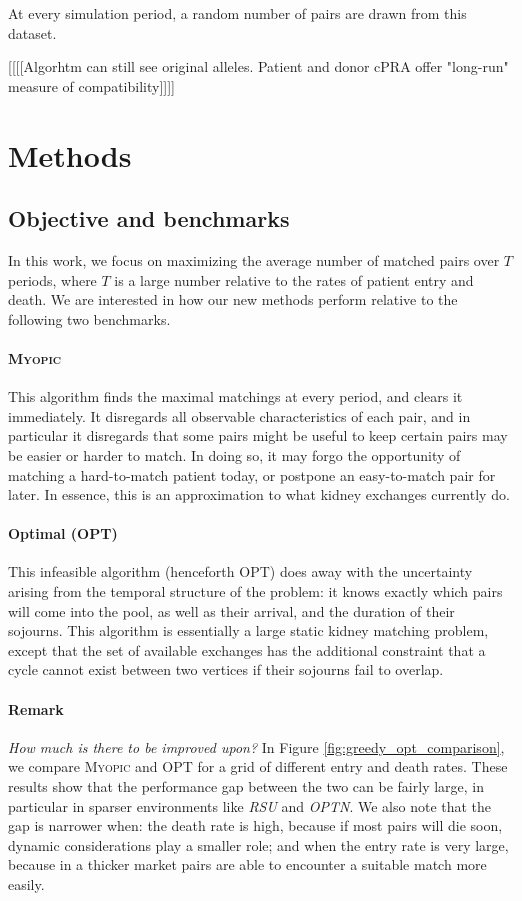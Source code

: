 \documentclass[format=acmsmall, review=false]{acmart}
\begin{document}
At every simulation period, a random number of pairs are drawn from this dataset.

[[[[Algorhtm can still see original alleles. Patient and donor cPRA offer "long-run" measure of compatibility]]]]


\section{Methods}

\subsection{Objective and benchmarks}

In this work, we focus on maximizing the average number of matched pairs over $T$ periods, where $T$ is a large number relative to the rates of patient entry and death. We are interested in how our new methods perform relative to the following two benchmarks.

\paragraph{\textsc{Myopic}}

This algorithm finds the maximal matchings at every period, and clears it immediately. It disregards all observable characteristics of each pair, and in particular it disregards that some pairs might be useful to keep certain pairs may be easier or harder to match. In doing so, it may forgo the opportunity of matching a hard-to-match patient today, or postpone an easy-to-match pair for later. In essence, this is an approximation to what kidney exchanges currently do.

\paragraph{Optimal (\textsc{OPT})} This infeasible algorithm (henceforth OPT) does away with the uncertainty arising from the temporal structure of the problem: it knows exactly which pairs will come into the pool, as well as their arrival, and the duration of their sojourns. This algorithm is essentially a large static kidney matching problem, except that the set of available exchanges has the additional constraint that a cycle cannot exist between two vertices if their sojourns fail to overlap.

\paragraph{\textbf{Remark}} \textit{How much is there to be improved upon?} In Figure \ref{fig:greedy_opt_comparison}, we compare \textsc{Myopic} and \textsc{OPT} for a grid of different entry and death rates. These results show that the performance gap between the two can be fairly large, in particular in sparser environments like \emph{RSU} and \emph{OPTN}. We also note that the gap is narrower when: the death rate is high, because if most pairs will die soon, dynamic considerations play a smaller role; and when the entry rate is very large, because in a thicker market pairs are able to encounter a suitable match more easily.
\end{document}
